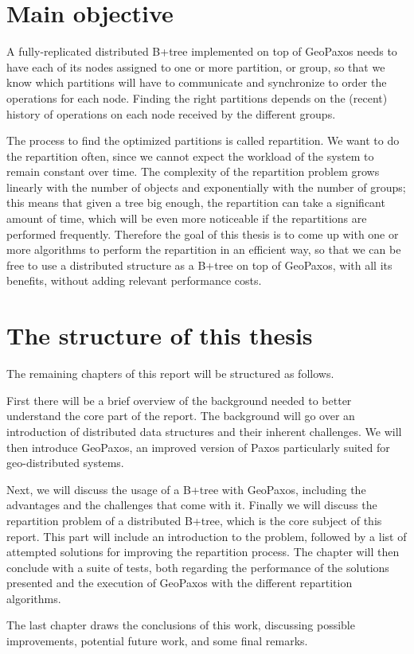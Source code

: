 \section{Main objective}\label{sec:main-objective}
A fully-replicated distributed B+tree implemented on top of GeoPaxos needs to have each of its nodes assigned to one or more partition, or group, so that we know which partitions will have to communicate and synchronize to order the operations for each node. Finding the right partitions depends on the (recent) history of operations on each node received by the different groups.

The process to find the optimized partitions is called repartition. We want to do the repartition often, since we cannot expect the workload of the system to remain constant over time. The complexity of the repartition problem grows linearly with the number of objects and exponentially with the number of groups; this means that given a tree big enough, the repartition can take a significant amount of time, which will be even more noticeable if the repartitions are performed frequently. Therefore the goal of this thesis is to come up with one or more algorithms to perform the repartition in an efficient way, so that we can be free to use a distributed structure as a B+tree on top of GeoPaxos, with all its benefits, without adding relevant performance costs.

\section{The structure of this thesis}\label{the-structure-of-this-thesis}
The remaining chapters of this report will be structured as follows.

First there will be a brief overview of the background needed to better understand the core part of the report. The background will go over an introduction of distributed data structures and their inherent challenges. We will then introduce GeoPaxos, an improved version of Paxos particularly suited for geo-distributed systems. 

Next, we will discuss the usage of a B+tree with GeoPaxos, including the advantages and the challenges that come with it. Finally we will discuss the repartition problem of a distributed B+tree, which is the core subject of this report. This part will include an introduction to the problem, followed by a list of attempted solutions for improving the repartition process. The chapter will then conclude with a suite of tests, both regarding the performance of the solutions presented and the execution of GeoPaxos with the different repartition algorithms.

The last chapter draws the conclusions of this work, discussing possible improvements, potential future work, and some final remarks.